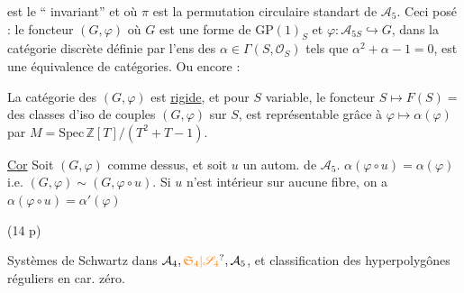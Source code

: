 est le `` invariant'' et où $\pi$ est la permutation
circulaire standart de $\mathcal A_5$. Ceci posé : le 
foncteur  $(G,\varphi)$  
où $G$ est une forme de
$\mathrm{GP}(1)_S$ et $\varphi:\mathcal A_{5S}\hookrightarrow G$, 
dans la catégorie
discrète définie par l'ens des $\alpha\in\Gamma(S,\mathcal O_S)$ tels
que $\alpha^2+\alpha-1=0$,
est une équivalence de catégories. Ou encore :


La catégorie des $(G,\varphi)$ est \uline{rigide}, et pour
$S$ variable, le foncteur $S\longmapsto F(S)={}$  des
classes d'iso de couples $(G,\varphi)$ sur $S$, est représentable
grâce à $\varphi\mapsto\alpha(\varphi)$ par $M=\mathrm{Spec}\,\mathbb Z[T]/(T^2+T-1)$.

\uline{Cor} Soit $(G,\varphi)$ comme dessus, et soit $u$ un
autom. de $\mathcal A_5$.  
$\alpha(\varphi\circ u)=\alpha(\varphi)$ i.e. $(G,\varphi)\sim(G,\varphi\circ u)$. Si $u$ n'est
intérieur sur aucune fibre, on a $\alpha(\varphi\circ u)=\alpha'(\varphi)$

(14 p)

Systèmes de Schwartz dans
$\mathcal A_4,\unsure{\mathfrak S_4|\mathscr S_4},\mathcal A_5$, et classification
des hyperpolygônes
réguliers en car. zéro.

